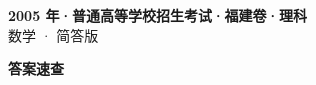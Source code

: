 \documentclass[zihao=-4, a4paper]{ctexart}
\begin{document}
\begin{center}
  {\Large\bfseries 2005 年·普通高等学校招生考试·福建卷·理科}\\[4pt]
  {\large 数学 · 简答版}
\end{center}
\medskip
{}

\clearpage
{}
\begin{center}{\Large\bfseries 答案速查}\end{center}
\medskip

\end{document}
